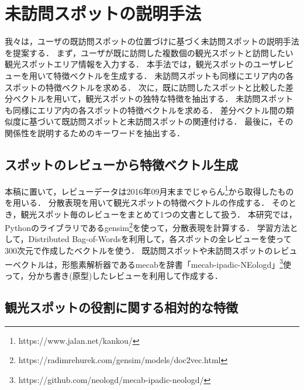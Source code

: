 \documentclass{deimj}
\begin{document}
\section{未訪問スポットの説明手法}
\label{sec:未訪問スポットの説明手法}
我々は，ユーザの既訪問スポットの位置づけに基づく未訪問スポットの説明手法を提案する．
まず，ユーザが既に訪問した複数個の観光スポットと訪問したい観光スポットエリア情報を入力する．
本手法では，観光スポットのユーザレビューを用いて特徴ベクトルを生成する．
未訪問スポットも同様にエリア内の各スポットの特徴ベクトルを求める．
次に，既に訪問したスポットと比較した差分ベクトルを用いて，観光スポットの独特な特徴を抽出する．
未訪問スポットも同様にエリア内の各スポットの特徴ベクトルを求める．
差分ベクトル間の類似度に基づいて既訪問スポットと未訪問スポットの関連付ける．
最後に，その関係性を説明するためのキーワードを抽出する．

\subsection{スポットのレビューから特徴ベクトル生成}
\label{subsec:スポットのレビューから特徴ベクトル生成}
本稿に置いて，レビューデータは2016年09月末までじゃらん\footnote{https://www.jalan.net/kankou/}から取得したものを用いる．
分散表現\cite{Codd10}を用いて観光スポットの特徴ベクトルの作成する．
そのとき，観光スポット毎のレビューをまとめて1つの文書として扱う．
本研究では，Pythonのライブラリであるgensim\footnote{https://radimrehurek.com/gensim/models/doc2vec.html}を使って，分散表現を計算する．
学習方法として，Distributed Bag-of-Wordsを利用して，各スポットの全レビューを使って300次元で作成したベクトルを使う．
既訪問スポットや未訪問スポットのレビューベクトルは，形態素解析器であるmecab\cite{Codd11}を辞書「mecab-ipadic-NEologd」\footnote{https://github.com/neologd/mecab-ipadic-neologd/}使って，分かち書き(原型)したレビューを利用して作成する．

\subsection{観光スポットの役割に関する相対的な特徴}
\label{subsec:観光スポットの役割に関する相対的な特徴}
\end{document}
